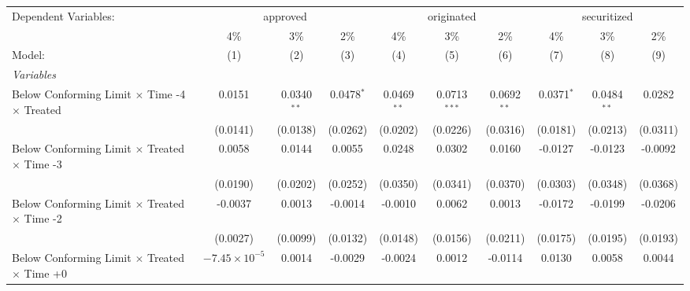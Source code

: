 \begingroup
\centering
\begin{tabular}{lccccccccc}
   \tabularnewline \midrule \midrule
   Dependent Variables: & \multicolumn{3}{c}{approved} & \multicolumn{3}{c}{originated} & \multicolumn{3}{c}{securitized}\\
                                                              & 4\%                    & 3\%            & 2\%           & 4\%           & 3\%            & 2\%           & 4\%           & 3\%           & 2\% \\    
   Model:                                                     & (1)                    & (2)            & (3)           & (4)           & (5)            & (6)           & (7)           & (8)           & (9)\\  
   \midrule
   \emph{Variables}\\
   Below Conforming Limit $\times$ Time -4 $\times$ Treated   & 0.0151                 & 0.0340$^{**}$  & 0.0478$^{*}$  & 0.0469$^{**}$ & 0.0713$^{***}$ & 0.0692$^{**}$ & 0.0371$^{*}$  & 0.0484$^{**}$ & 0.0282\\   
                                                              & (0.0141)               & (0.0138)       & (0.0262)      & (0.0202)      & (0.0226)       & (0.0316)      & (0.0181)      & (0.0213)      & (0.0311)\\   
   Below Conforming Limit $\times$ Treated $\times$ Time -3   & 0.0058                 & 0.0144         & 0.0055        & 0.0248        & 0.0302         & 0.0160        & -0.0127       & -0.0123       & -0.0092\\   
                                                              & (0.0190)               & (0.0202)       & (0.0252)      & (0.0350)      & (0.0341)       & (0.0370)      & (0.0303)      & (0.0348)      & (0.0368)\\   
   Below Conforming Limit $\times$ Treated $\times$ Time -2   & -0.0037                & 0.0013         & -0.0014       & -0.0010       & 0.0062         & 0.0013        & -0.0172       & -0.0199       & -0.0206\\   
                                                              & (0.0027)               & (0.0099)       & (0.0132)      & (0.0148)      & (0.0156)       & (0.0211)      & (0.0175)      & (0.0195)      & (0.0193)\\   
   Below Conforming Limit $\times$ Treated $\times$ Time +0   & $-7.45\times 10^{-5}$  & 0.0014         & -0.0029       & -0.0024       & 0.0012         & -0.0114       & 0.0130        & 0.0058        & 0.0044\\   

\end{tabular}
